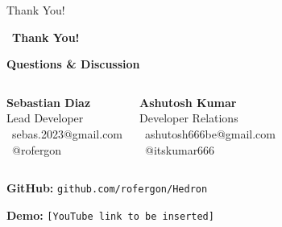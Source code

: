 \documentclass[aspectratio=169]{beamer}
\begin{document}
\begin{frame}{Thank You!}
\begin{center}
\large \faHeart\ \textbf{Thank You!}

\vspace{0.2cm}

\small \textbf{Questions \& Discussion}

\vspace{0.3cm}

\begin{columns}
\hspace{2.5cm}
\textbf{\footnotesize Sebastian Diaz}\\
\vspace{0.05cm}
\footnotesize Lead Developer\\
\vspace{0.05cm}
\footnotesize \faEnvelope\ sebas.2023@gmail.com\\
\footnotesize \faGithub\ @rofergon

\textbf{\footnotesize Ashutosh Kumar}\\
\vspace{0.05cm}
\footnotesize Developer Relations\\
\vspace{0.05cm}
\footnotesize \faEnvelope\ ashutosh666be@gmail.com
\\
\footnotesize \faGithub\ @itskumar666
\end{columns}

\vspace{0.3cm}

\textbf{\footnotesize GitHub:} \hspace{0.2cm} \texttt{\footnotesize github.com/rofergon/Hedron}

\vspace{0.1cm}

\textbf{\footnotesize Demo:} \texttt{\footnotesize [YouTube link to be inserted]}
\end{center}
\end{frame}
\end{document}
